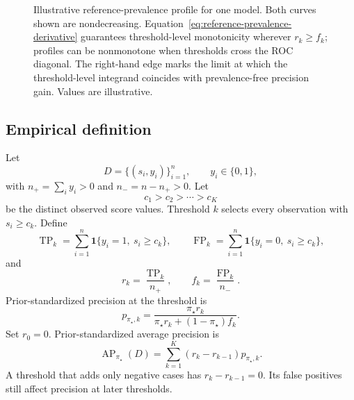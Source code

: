 \documentclass[11pt]{article}
\newcommand{\AP}{\operatorname{AP}}
\newcommand{\CNAP}{\operatorname{CNAP}}
\newcommand{\Tpi}{\CNAP_{\pi_\star}}
\newcommand{\SAPHat}{\widehat S_{2,\pi_\star}^{\,\mathrm{AP}}}
\theoremstyle{remark}
\begin{document}
\begin{figure}[ht]
\centering
{}
\caption{Illustrative reference-prevalence profile for one model. Both curves shown are nondecreasing. Equation~\eqref{eq:reference-prevalence-derivative} guarantees threshold-level monotonicity wherever $r_k\geq f_k$; profiles can be nonmonotone when thresholds cross the ROC diagonal. The right-hand edge marks the limit at which the threshold-level integrand coincides with prevalence-free precision gain. Values are illustrative.}
\label{fig:profile}
\end{figure}

\subsection{Empirical definition}

Let
\[
D=\{(s_i,y_i)\}_{i=1}^{n},
\qquad y_i\in\{0,1\},
\]
with $n_+=\sum_i y_i>0$ and $n_-=n-n_+>0$. Let
\[
c_1>c_2>\cdots>c_K
\]
be the distinct observed score values. Threshold $k$ selects every observation with $s_i\geq c_k$. Define
\[
\operatorname{TP}_k
=
\sum_{i=1}^{n}\mathbf{1}\{y_i=1,\ s_i\geq c_k\},
\qquad
\operatorname{FP}_k
=
\sum_{i=1}^{n}\mathbf{1}\{y_i=0,\ s_i\geq c_k\},
\]
and
\[
r_k=\frac{\operatorname{TP}_k}{n_+},
\qquad
f_k=\frac{\operatorname{FP}_k}{n_-}.
\]
Prior-standardized precision at the threshold is
\begin{equation}
p_{\pi_\star,k}
=
\frac{\pi_\star r_k}
{\pi_\star r_k+(1-\pi_\star)f_k}.
\label{eq:empirical-reference-precision}
\end{equation}
Set $r_0=0$. Prior-standardized average precision is
\begin{equation}
\AP_{\pi_\star}(D)
=
\sum_{k=1}^{K}
(r_k-r_{k-1})p_{\pi_\star,k}.
\label{eq:standardized-ap}
\end{equation}
A threshold that adds only negative cases has $r_k-r_{k-1}=0$. Its false positives still affect precision at later thresholds.
\end{document}
